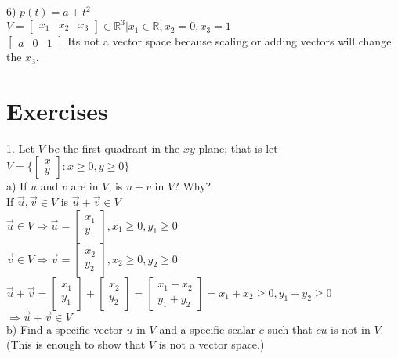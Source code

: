 \documentclass[a4paper]{article}
\begin{document}
6) $p(t) = a + t^2$\\
$V = \begin{bmatrix}
x_1&x_2&x_3
\end{bmatrix} \in \mathbb{R}^3 | x_1 \in \mathbb{R}, x_2 = 0, x_3 = 1$\\
$\begin{bmatrix}
a&0&1
\end{bmatrix}$
Its not a vector space because scaling or adding vectors will change the $x_3$.\\

\section{Exercises}

1. Let $V$ be the first quadrant in the $xy$-plane; that is let $V = \{
\begin{bmatrix}
x\\
y
\end{bmatrix} : x \geq 0, y \geq 0 \} $\\
a) If $u$ and $v$ are in $V$, is $u+v$ in $V$? Why?\\
If $\vec{u}, \vec{v} \in V$ is $\vec{u} + \vec{v} \in V$\\
$\vec{u} \in V \Rightarrow \vec{u} = \begin{bmatrix}
x_1\\
y_1
\end{bmatrix}, x_1 \geq 0, y_1 \geq 0$\\
$\vec{v} \in V \Rightarrow \vec{v} = \begin{bmatrix}
x_2\\
y_2
\end{bmatrix}, x_2 \geq 0, y_2 \geq 0$\\
$\vec{u} + \vec{v} = \begin{bmatrix}
x_1\\
y_1
\end{bmatrix} + \begin{bmatrix}
x_2\\
y_2
\end{bmatrix} = \begin{bmatrix}
x_1 + x_2\\
y_1 + y_2
\end{bmatrix} = x_1 + x_2 \geq 0, y_1 + y_2 \geq 0$\\
$\Rightarrow \vec{u} + \vec{v} \in V$\\
b) Find a specific vector $u$ in $V$ and a specific scalar $c$ such that $cu$ is not in $V$. (This is enough to show that $V$ is not a vector space.)\\
\end{document}
